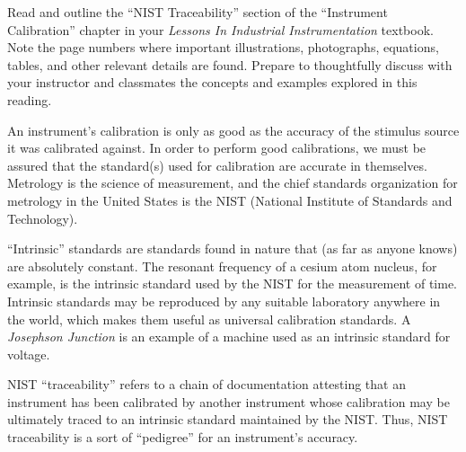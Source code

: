 

Read and outline the ``NIST Traceability'' section of the ``Instrument Calibration'' chapter in your {\it Lessons In Industrial Instrumentation} textbook.  Note the page numbers where important illustrations, photographs, equations, tables, and other relevant details are found.  Prepare to thoughtfully discuss with your instructor and classmates the concepts and examples explored in this reading.














An instrument's calibration is only as good as the accuracy of the stimulus source it was calibrated against.  In order to perform good calibrations, we must be assured that the standard(s) used for calibration are accurate in themselves.  Metrology is the science of measurement, and the chief standards organization for metrology in the United States is the NIST (National Institute of Standards and Technology).

\vskip 10pt

``Intrinsic'' standards are standards found in nature that (as far as anyone knows) are absolutely constant.  The resonant frequency of a cesium atom nucleus, for example, is the intrinsic standard used by the NIST for the measurement of time.  Intrinsic standards may be reproduced by any suitable laboratory anywhere in the world, which makes them useful as universal calibration standards.  A {\it Josephson Junction} is an example of a machine used as an intrinsic standard for voltage.

\vskip 10pt

NIST ``traceability'' refers to a chain of documentation attesting that an instrument has been calibrated by another instrument whose calibration may be ultimately traced to an intrinsic standard maintained by the NIST.  Thus, NIST traceability is a sort of ``pedigree'' for an instrument's accuracy.









